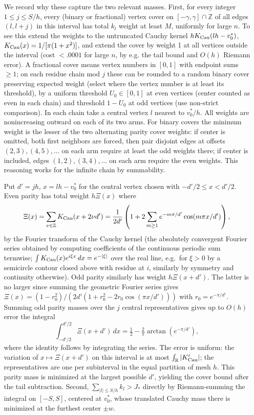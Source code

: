 \documentclass[11pt]{article}
\begin{document}
We record why these capture the two relevant masses. First, for every integer \(1\le j\le S/h\), every (binary or fractional) vertex cover on \([-\gamma,\gamma]\cap\mathbb Z\) of all edges \((l,l+j)\) in this interval has total \(k_l\) weight at least \(M\), uniformly for large \(n\). To see this extend the weights to the untruncated Cauchy kernel \(h K_{\rm Cau}(lh-v_0^*)\), \(K_{\rm Cau}(x)=1/[\pi(1+x^2)]\), and extend the cover by weight 1 at all vertices outside the interval (cost \(<.0001\) for large \(n\), by e.g. the tail bound and \(O(h)\) Riemann error). A fractional cover means vertex numbers in \([0,1]\) with endpoint sums \(\ge1\); on each residue chain mod \(j\) these can be rounded to a random binary cover preserving expected weight (select where the vertex number is at least its threshold), by a uniform threshold \(U_0\in[0,1]\) at even vertices (center counted as even in each chain) and threshold \(1-U_0\) at odd vertices (use non-strict comparison). In each chain take a central vertex \(l\) nearest to \(v_0^*/h\). All weights are nonincreasing outward on each of its two arms. For binary covers the minimum weight is the lesser of the two alternating parity cover weights: if center is omitted, both first neighbors are forced, then pair disjoint edges at offsets \((2,3),(4,5),\ldots\) on each arm require at least the odd weights there; if center is included, edges \((1,2),(3,4),\ldots\) on each arm require the even weights. This reasoning works for the infinite chain by summability.

Put \(d'=jh\), \(x=lh-v_0^*\) for the central vertex chosen with \(-d'/2\le x<d'/2\). Even parity has total weight \(h\Xi(x)\) where
\[
\Xi(x)=\sum_{\nu\in\mathbb Z} K_{\rm Cau}(x+2\nu d') = \frac1{2d'}\left(1+2\sum_{m\ge1}e^{-m\pi/d'}\cos(m\pi x/d')\right),
\]
by the Fourier transform of the Cauchy kernel (the absolutely convergent Fourier series obtained by computing coefficients of the continuous periodic sum termwise; $\int K_{\rm Cau}(x)e^{i\xi x}\,dx=e^{-|\xi|}$ over the real line, e.g.\ for $\xi>0$ by a semicircle contour closed above with residue at $i$, similarly by symmetry and continuity otherwise). Odd parity similarly has weight \(h\Xi(x+d')\). The latter is no larger since summing the geometric Fourier series gives \(\Xi(x)=(1-r_0^2)/(2d'(1+r_0^2-2r_0\cos(\pi x/d')))\) with \(r_0=e^{-\pi/d'}\). Summing odd parity masses over the \(j\) central representatives gives up to \(O(h)\) error the integral
\[
\int_{-d'/2}^{d'/2}\Xi(x+d')\,dx =\tfrac12-\tfrac2\pi\arctan(e^{-\pi/d'}),
\]
where the identity follows by integrating the series. The error is uniform: the variation of \(x\mapsto\Xi(x+d')\) on this interval is at most \(\int_{\mathbb R}|K_{\rm Cau}'|\); the representatives are one per subinterval in the equal partition of mesh \(h\). This parity mass is minimized at the largest possible \(d'\), yielding the cover bound after the tail subtraction. Second, \(\sum_{|l|\le S/h}k_l>J_*\) directly by Riemann-summing the integral on \([-S,S]\), centered at \(v_0^*\), whose translated Cauchy mass there is minimized at the furthest center \(\pm w\).
\end{document}
